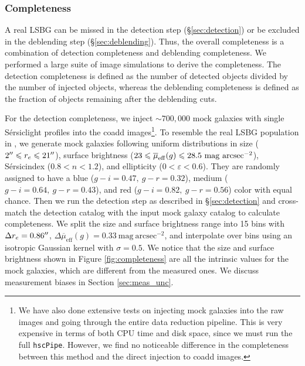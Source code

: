 \documentclass[twocolumn,astrosymb,twocolappendix]{aastex631}
\newcommand{\sbunit}{\mathrm{mag\ arcsec}^{-2}}
\newcommand{\sbeff}{\overline{\mu}_{\mathrm{eff}}(g)}
\newcommand{\code}[1]{\texttt{#1}}
\newcommand{\sersic}{S\'ersic}
\begin{document}
\begin{CJK*}{UTF8}{gbsn}
\subsubsection{Completeness}\label{sec:completeness}
A real LSBG can be missed in the detection step (\S \ref{sec:detection}) or be excluded in the deblending step (\S \ref{sec:deblending}). Thus, the overall completeness is a combination of detection completeness and deblending completeness. We performed a large suite of image simulations to derive the completeness. The detection completeness is defined as the number of detected objects divided by the number of injected objects, whereas the deblending completeness is defined as the fraction of objects remaining after the deblending cuts. 

For the detection completeness, we inject $\sim 700,000$ mock galaxies with single \sersic light profiles \citep{Sersic1963} into the coadd images\footnote{We have also done extensive tests on injecting mock galaxies into the raw images and going through the entire data reduction pipeline. This is very expensive in terms of both CPU time and disk space, since we must run the full \code{hscPipe}. However, we find no noticeable difference in the completeness between this method and the direct injection to coadd images.}. To resemble the real LSBG population in , we generate mock galaxies following uniform distributions in size ($2\mbox{$^{\prime\prime}$} \leqslant r_{e} \leqslant 21\mbox{$^{\prime\prime}$}$), surface brightness ($23 \leqslant \overline{\mu}_{\rm eff}(g) \leqslant 28.5\ \mathrm{mag\ arcsec^{-2}}$), \sersic index ($0.8 < n < 1.2$), and ellipticity ($0 < \varepsilon < 0.6$). They are randomly assigned to have a blue ($g-i=0.47,\ g-r=0.32$), medium ($g-i=0.64,\ g-r=0.43$), and red ($g-i=0.82,\ g-r=0.56$) color with equal chance. Then we run the detection step as described in \S \ref{sec:detection} and cross-match the detection catalog with the input mock galaxy catalog to calculate completeness. We split the size and surface brightness range into 15 bins with $\Delta r_e = 0.86\mbox{$^{\prime\prime}$}$, $\Delta \sbeff = 0.33\ \sbunit$, and interpolate over bins using an isotropic Gaussian kernel with $\sigma = 0.5$. We notice that the size and surface brightness shown in Figure \ref{fig:completeness} are all the intrinsic values for the mock galaxies, which are different from the measured ones. We discuss measurement biases in Section \ref{sec:meas_unc}.


\end{CJK*}
\end{document}
